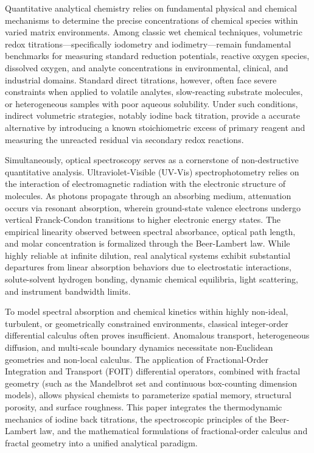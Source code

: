 \documentclass[12pt]{article}
\begin{document}
Quantitative analytical chemistry relies on fundamental physical and chemical mechanisms to determine the precise concentrations of chemical species within varied matrix environments. Among classic wet chemical techniques, volumetric redox titrations—specifically iodometry and iodimetry—remain fundamental benchmarks for measuring standard reduction potentials, reactive oxygen species, dissolved oxygen, and analyte concentrations in environmental, clinical, and industrial domains. Standard direct titrations, however, often face severe constraints when applied to volatile analytes, slow-reacting substrate molecules, or heterogeneous samples with poor aqueous solubility. Under such conditions, indirect volumetric strategies, notably iodine back titration, provide a accurate alternative by introducing a known stoichiometric excess of primary reagent and measuring the unreacted residual via secondary redox reactions.

Simultaneously, optical spectroscopy serves as a cornerstone of non-destructive quantitative analysis. Ultraviolet-Visible (UV-Vis) spectrophotometry relies on the interaction of electromagnetic radiation with the electronic structure of molecules. As photons propagate through an absorbing medium, attenuation occurs via resonant absorption, wherein ground-state valence electrons undergo vertical Franck-Condon transitions to higher electronic energy states. The empirical linearity observed between spectral absorbance, optical path length, and molar concentration is formalized through the Beer-Lambert law. While highly reliable at infinite dilution, real analytical systems exhibit substantial departures from linear absorption behaviors due to electrostatic interactions, solute-solvent hydrogen bonding, dynamic chemical equilibria, light scattering, and instrument bandwidth limits.

To model spectral absorption and chemical kinetics within highly non-ideal, turbulent, or geometrically constrained environments, classical integer-order differential calculus often proves insufficient. Anomalous transport, heterogeneous diffusion, and multi-scale boundary dynamics necessitate non-Euclidean geometries and non-local calculus. The application of Fractional-Order Integration and Transport (FOIT) differential operators, combined with fractal geometry (such as the Mandelbrot set and continuous box-counting dimension models), allows physical chemists to parameterize spatial memory, structural porosity, and surface roughness. This paper integrates the thermodynamic mechanics of iodine back titrations, the spectroscopic principles of the Beer-Lambert law, and the mathematical formulations of fractional-order calculus and fractal geometry into a unified analytical paradigm.
\end{document}
